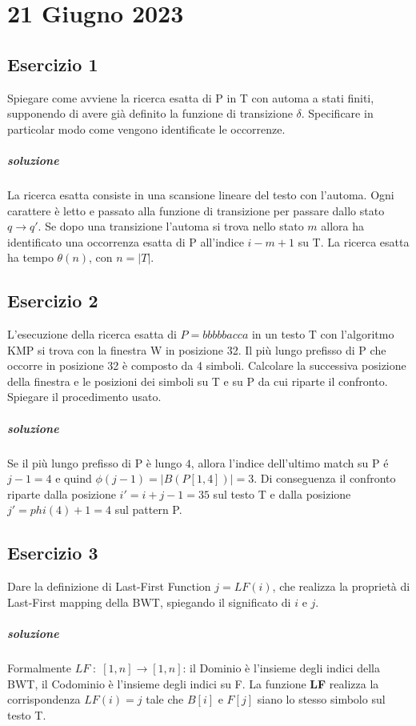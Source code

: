 \chapter{21 Giugno 2023}

\section{Esercizio 1}

Spiegare come avviene la ricerca esatta di P in T con automa a stati finiti, supponendo di avere già definito la funzione di transizione $\delta$.
Specificare in particolar modo come vengono identificate le occorrenze.

\paragraph{soluzione} La ricerca esatta consiste in una scansione lineare del testo con l'automa. Ogni carattere \`e letto e passato alla funzione di transizione per passare dallo stato $q \rightarrow q'$. Se dopo una transizione l'automa si trova nello stato $m$ allora ha identificato una occorrenza esatta di P all'indice $i-m+1$ su T. La ricerca esatta ha tempo $\theta(n)$, con $n = |T|$.

\section{Esercizio 2}

L'esecuzione della ricerca esatta di $P = bbbbbacca$ in un testo T con l'algoritmo KMP si trova con la finestra W in posizione 32.
Il pi\`u lungo prefisso di P che occorre in posizione 32 \`e composto da 4 simboli. Calcolare la successiva posizione della finestra e le posizioni dei simboli su T e su P da cui riparte il confronto.
Spiegare il procedimento usato.

\paragraph{soluzione} Se il pi\`u lungo prefisso di P \`e lungo $4$, allora l'indice dell'ultimo match su P \'e $j-1 = 4$ e quind $\phi(j-1) = |B(P[1,4])| = 3$. Di conseguenza il confronto riparte dalla posizione $i' = i + j - 1 = 35$ sul testo T e dalla posizione $j' = phi(4) + 1 = 4$ sul pattern P.

\section{Esercizio 3}

Dare la definizione di Last-First Function $j = LF(i)$, che realizza la proprietà di Last-First mapping della BWT, spiegando il significato di $i$ e $j$.

\paragraph{soluzione} Formalmente $LF \; : \; [1,n] \rightarrow [1,n]$: il Dominio \`e l'insieme degli indici della BWT, il Codominio \`e l'insieme degli indici su F. La funzione \textbf{LF} realizza la corrispondenza $LF(i) = j$ tale che $B[i]$ e $F[j]$ siano lo stesso simbolo sul testo T.
